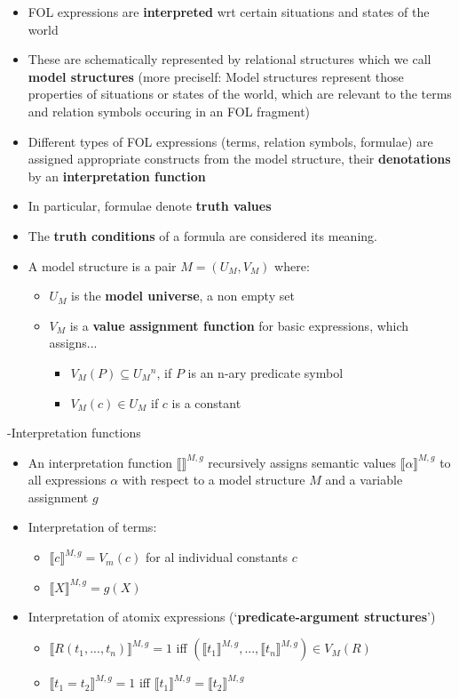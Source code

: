 \documentclass[11pt]{article}
\newenvironment{itemise}{
\begin{itemize}
  \setlength{\itemsep}{1pt}
  \setlength{\parskip}{0pt}
  \setlength{\parsep}{0pt}
}{\end{itemize}}
\begin{document}
\begin{itemise}
 \item FOL expressions are {\bf interpreted} wrt certain situations and states of the world
 \item These are schematically represented by relational structures which we call {\bf model structures} (more preciself: Model structures represent those properties of situations or states of the world, which are relevant to the terms and relation symbols occuring in an FOL fragment)
 \item Different types of FOL expressions (terms, relation symbols, formulae) are assigned appropriate constructs from the model structure, their {\bf denotations} by an {\bf interpretation function}
 \item In particular, formulae denote {\bf truth values}
 \item The {\bf truth conditions} of a formula are considered its meaning.
 \item A model structure is a pair $M = (U_M , V_M)$ where:
\begin{itemise}
 \item $U_M$ is the {\bf model universe}, a non empty set
 \item $V_M$ is a {\bf value assignment function} for basic expressions, which assigns...
\begin{itemise}
 \item $V_M (P) \subseteq U{_M}^n$, if $P$ is an n-ary predicate symbol
 \item $V_M (c) \in U_M$ if $c$ is a constant
\end{itemise} 
\end{itemise}
\end{itemise}
-Interpretation functions
\begin{itemise}
 \item An interpretation function $\llbracket\rrbracket ^{M,g}$ recursively assigns semantic values $\llbracket\alpha\rrbracket^{M,g}$ to all expressions $\alpha$ with respect to a model structure $M$ and a variable assignment $g$
 \item Interpretation of terms:
\begin{itemise}
 \item $\llbracket c\rrbracket^{M,g} = V_m (c)$ for al individual constants $c$
 \item $\llbracket X\rrbracket^{M,g} = g(X)$
\end{itemise}
 \item Interpretation of atomix expressions (`{\bf predicate-argument structures}')
\begin{itemise}
 \item $\llbracket R(t_1 , ..., t_n)\rrbracket^{M,g} = 1$ iff $(\llbracket t_1\rrbracket^{M,g}, ...,\llbracket t_n\rrbracket^{M,g}) \in V_M (R)$ %
 \item $\llbracket t_1 = t_2\rrbracket^{M,g} = 1$ iff $\llbracket t_1\rrbracket^{M,g} = \llbracket t_2\rrbracket^{M,g}$
\end{itemise}
\end{itemise}
\end{document}
